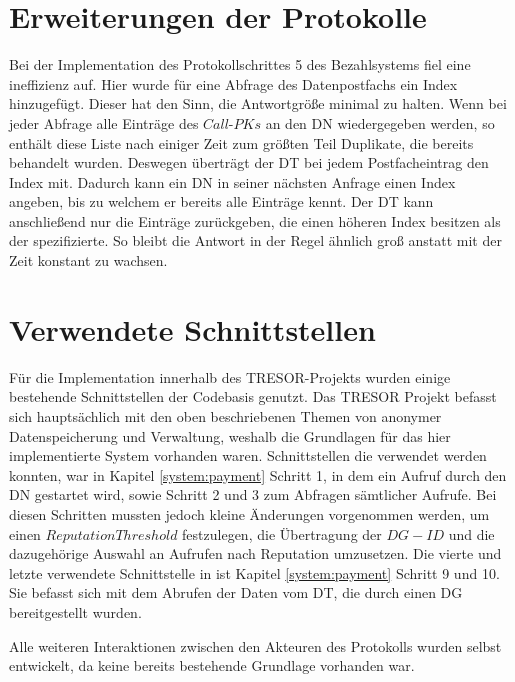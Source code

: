 \documentclass[
	fontsize=11pt,
	headings=small,
	parskip=half,           %
	bibliography=totoc,
	numbers=noenddot,       %
	open=any,               %
]{scrreprt}
\begin{document}
\section{Erweiterungen der Protokolle}
Bei der Implementation des Protokollschrittes 5 des Bezahlsystems fiel eine ineffizienz auf. Hier wurde für eine Abfrage des Datenpostfachs ein Index hinzugefügt. Dieser hat den Sinn, die Antwortgröße minimal zu halten. Wenn bei jeder Abfrage alle Einträge des $Call$-$PKs$ an den DN wiedergegeben werden, so enthält diese Liste nach einiger Zeit zum größten Teil Duplikate, die bereits behandelt wurden. Deswegen überträgt der DT bei jedem Postfacheintrag den Index mit. Dadurch kann ein DN in seiner nächsten Anfrage einen Index angeben, bis zu welchem er bereits alle Einträge kennt. Der DT kann anschließend nur die Einträge zurückgeben, die einen höheren Index besitzen als der spezifizierte. So bleibt die Antwort in der Regel ähnlich groß anstatt mit der Zeit konstant zu wachsen.

\section{Verwendete Schnittstellen}
Für die Implementation innerhalb des TRESOR-Projekts wurden einige bestehende Schnittstellen der Codebasis genutzt. Das TRESOR Projekt befasst sich hauptsächlich mit den oben beschriebenen Themen von anonymer Datenspeicherung und Verwaltung, weshalb die Grundlagen für das hier implementierte System vorhanden waren. Schnittstellen die verwendet werden konnten, war in Kapitel \ref{system:payment} Schritt 1, in dem ein Aufruf durch den DN gestartet wird, sowie Schritt 2 und 3 zum Abfragen sämtlicher Aufrufe. Bei diesen Schritten mussten jedoch kleine Änderungen vorgenommen werden, um einen $ReputationThreshold$ festzulegen, die Übertragung der $DG-ID$ und die dazugehörige Auswahl an Aufrufen nach Reputation umzusetzen. Die vierte und letzte verwendete Schnittstelle in ist Kapitel \ref{system:payment} Schritt 9 und 10. Sie befasst sich mit dem Abrufen der Daten vom DT, die durch einen DG bereitgestellt wurden. 

Alle weiteren Interaktionen zwischen den Akteuren des Protokolls wurden selbst entwickelt, da keine bereits bestehende Grundlage vorhanden war. 
\end{document}
